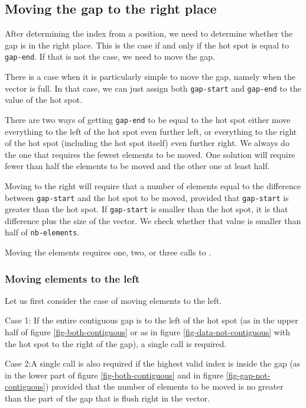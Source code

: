 \documentclass[11pt]{article}
\begin{document}
\subsection{Moving the gap to the right place}

After determining the index from a position, we need to determine
whether the gap is in the right place.  This is the case if and only
if the hot spot is equal to \texttt{gap-end}.  If that is not the
case, we need to move the gap.

There is a case when it is particularly simple to move the gap, namely
when the vector is full.  In that case, we can just assign both
\texttt{gap-start} and \texttt{gap-end} to the value of the hot spot. 

There are two ways of getting \texttt{gap-end} to be equal to the hot
spot either move everything to the left of the hot spot even further
left, or everything to the right of the hot spot (including the hot
spot itself) even further right. We always do the one that requires
the fewest elements to be moved.  One solution will require fewer than
half the elements to be moved and the other one at least half.  

Moving to the right will require that a number of elements equal to
the difference between \texttt{gap-start} and the hot spot to be
moved, provided that \texttt{gap-start} is greater than the hot spot.
If \texttt{gap-start} is smaller than the hot spot, it is that
difference plus the size of the vector. We check whether that value is
smaller than half of \texttt{nb-elements}. 

Moving the elements requires one, two, or three calls to .

\subsubsection{Moving elements to the left}

Let us first consider the case of moving elements to the left. 

Case 1: If the entire contiguous gap is to the left of the hot spot
(as in the upper half of figure \ref{fig-both-contiguous} or as in
figure \ref{fig-data-not-contiguous} with the hot spot to the right of
the gap), a single call is required.

Case 2:A single call is also required if the highest valid index is
inside the gap (as in the lower part of figure
\ref{fig-both-contiguous} and in figure \ref{fig-gap-not-contiguous})
provided that the number of elements to be moved is no greater than
the part of the gap that is flush right in the vector.
\end{document}
